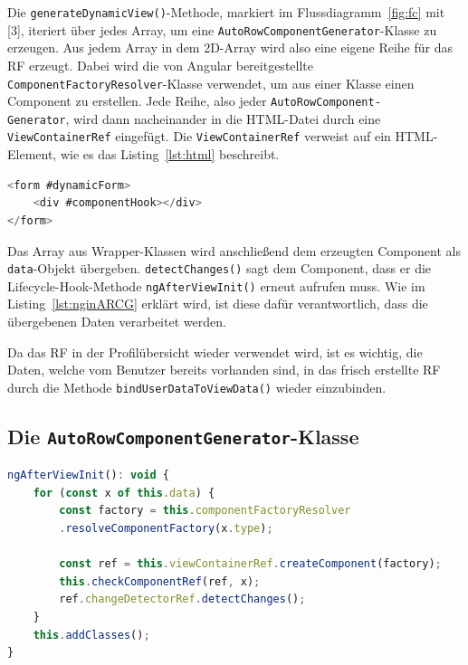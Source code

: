 Die \texttt{generateDynamicView()}-Methode, markiert im Flussdiagramm~\ref{fig:fc} mit [3], iteriert über jedes Array, um eine \texttt{AutoRowComponentGenerator}-Klasse zu erzeugen. Aus jedem Array in dem 2D-Array wird also eine eigene Reihe für das RF erzeugt. Dabei wird die von Angular bereitgestellte \texttt{ComponentFactoryResolver}-Klasse verwendet, um aus einer Klasse einen Component zu erstellen. 
Jede Reihe, also jeder \texttt{AutoRowComponent-\\Generator}, wird dann nacheinander in die HTML-Datei durch eine \texttt{ViewContainerRef} eingefügt. Die \texttt{ViewContainerRef} verweist auf ein HTML-Element, wie es das Listing~\ref{lst:html} beschreibt.

\begin{lstlisting}[caption={ViewContainerRef verweist auf \#componentHook}, language=JavaScript,label={lst:html}]
<form #dynamicForm>
	<div #componentHook></div>
</form>
\end{lstlisting}

Das Array aus Wrapper-Klassen wird anschließend dem erzeugten Component als \texttt{data}-Objekt übergeben. \texttt{detectChanges()} sagt dem Component, dass er die Lifecycle-Hook-Methode \texttt{ngAfterViewInit()} erneut aufrufen muss. Wie im Listing~\ref{lst:nginARCG} erklärt wird, ist diese dafür verantwortlich, dass die übergebenen Daten verarbeitet werden.

Da das RF in der Profilübersicht wieder verwendet wird, ist es wichtig, die Daten, welche vom Benutzer bereits vorhanden sind, in das frisch erstellte RF durch die Methode \texttt{bindUserDataToViewData()} wieder einzubinden.

\subsection{Die \texttt{AutoRowComponentGenerator}-Klasse}

\begin{lstlisting}[caption={Die \texttt{ngAfterViewInit()}-Methode der \texttt{AutoRowComponentGenerator}-Klasse}, language=JavaScript,label={lst:nginARCG}]
ngAfterViewInit(): void {
	for (const x of this.data) {
		const factory = this.componentFactoryResolver
		.resolveComponentFactory(x.type);
		
		const ref = this.viewContainerRef.createComponent(factory);
		this.checkComponentRef(ref, x);
		ref.changeDetectorRef.detectChanges();
	}
	this.addClasses();
}
\end{lstlisting}

